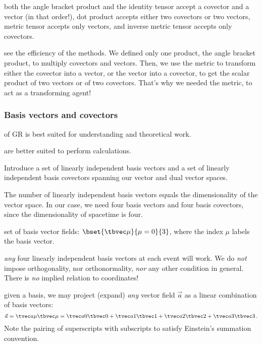  both the angle bracket product and the identity tensor accept a covector and a vector (in that order!), dot product accepts either two covectors or two vectors, metric tensor accepts only vectors, and inverse metric tensor accepts only covectors.

 see the efficiency of the methods. We defined only one product, the angle bracket product, to multiply covectors and vectors. Then, we use the metric to transform either the covector into a vector, or the vector into a covector, to get the scalar product of two vectors or of two covectors. That's why we needed the metric, to act as a transforming agent!


\subsubsection{Basis vectors and covectors}
%
 of GR is best suited for understanding and theoretical work.

 are better suited to perform calculations.

 Introduce a set of linearly independent basis vectors and a set of linearly independent basis covectors spanning our vector and dual vector spaces.

 The number of linearly independent basis vectors equals the dimensionality of the vector space. In our case, we need four basis vectors and four basis covectors, since the dimensionality of spacetime is four.

 set of basis vector fields: $\bset{\tbvec\mu}{\mu = 0}{3}$, where the index $\mu$ labels the basis vector.

 \emph{any} four linearly independent basis vectors at each event will work. We do \emph{not} impose orthogonality, nor orthonormality, \emph{nor} any other condition in general. There is \emph{no} implied relation to coordinates!

 given a basis, we may project (expand) \emph{any} vector field $\vec a$ as a linear combination of basis vectors:
%
\begin{equation}\label{eq:vectorprojectiononbasisvectors}
  \vec a = \tvec a\mu\tbvec\mu
         = \tvec a0\tbvec 0 + \tvec a1\tbvec 1 + \tvec a2\tbvec 2 + \tvec a3\tbvec 3\,.
\end{equation}
%
Note the pairing of superscripts with subscripts to satisfy Einstein's summation convention.

